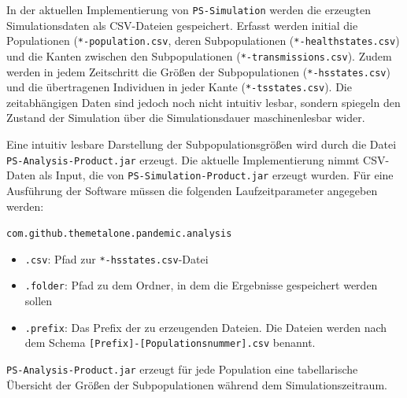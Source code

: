 In der aktuellen Implementierung von \texttt{PS-Simulation} werden die erzeugten Simulationsdaten als CSV-Dateien gespeichert. Erfasst werden initial die Populationen (\texttt{*-population.csv}, deren Subpopulationen (\texttt{*-healthstates.csv}) und die Kanten zwischen den Subpopulationen (\texttt{*-transmissions.csv}). Zudem werden in jedem Zeitschritt die Größen der Subpopulationen (\texttt{*-hsstates.csv}) und die übertragenen Individuen in jeder Kante (\texttt{*-tsstates.csv}). Die zeitabhängigen Daten sind jedoch noch nicht intuitiv lesbar, sondern spiegeln den Zustand der Simulation über die Simulationsdauer maschinenlesbar wider.

Eine intuitiv lesbare Darstellung der Subpopulationsgrößen wird durch die Datei \texttt{PS-Analysis-Product.jar} erzeugt. Die aktuelle Implementierung nimmt CSV-Daten als Input, die von \texttt{PS-Simulation-Product.jar} erzeugt wurden. Für eine Ausführung der Software müssen die folgenden Laufzeitparameter angegeben werden: 

\noindent\texttt{com.github.themetalone.pandemic.analysis}
\begin{itemize}
	\item \texttt{.csv}: Pfad zur \texttt{*-hsstates.csv}-Datei
	\item \texttt{.folder}: Pfad zu dem Ordner, in dem die Ergebnisse gespeichert werden sollen
	\item \texttt{.prefix}: Das Prefix der zu erzeugenden Dateien. Die Dateien werden nach dem Schema \texttt{[Prefix]-[Populationsnummer].csv} benannt. 
\end{itemize}
\texttt{PS-Analysis-Product.jar} erzeugt für jede Population eine tabellarische Übersicht der Größen der Subpopulationen während dem Simulationszeitraum. 